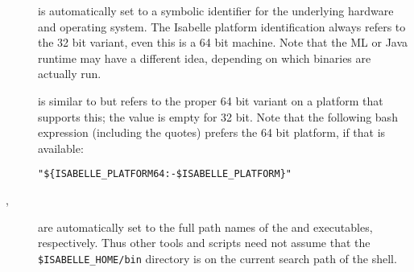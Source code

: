 \begin{isabellebody}
\begin{isamarkuptext}
\begin{description}
  \item[\hypertarget{setting.ISABELLE-PLATFORM}{\hyperlink{setting.ISABELLE-PLATFORM}{\mbox{}}}] is automatically
  set to a symbolic identifier for the underlying hardware and
  operating system.  The Isabelle platform identification always
  refers to the 32 bit variant, even this is a 64 bit machine.  Note
  that the ML or Java runtime may have a different idea, depending on
  which binaries are actually run.

  \item[\hypertarget{setting.ISABELLE-PLATFORM64}{\hyperlink{setting.ISABELLE-PLATFORM64}{\mbox{}}}] is similar to
  \hyperlink{setting.ISABELLE-PLATFORM}{\mbox{}} but refers to the proper 64 bit variant
  on a platform that supports this; the value is empty for 32 bit.
  Note that the following bash expression (including the quotes)
  prefers the 64 bit platform, if that is available:

  \verb|"${ISABELLE_PLATFORM64:-$ISABELLE_PLATFORM}"|

  \item[\hypertarget{setting.ISABELLE-PROCESS}{\hyperlink{setting.ISABELLE-PROCESS}{\mbox{}}}, \hyperlink{setting.ISABELLE-TOOL}{\mbox{}}] are automatically set to the full path
  names of the \hyperlink{executable.isabelle-process}{\mbox{}} and \hyperlink{executable.isabelle}{\mbox{}} executables, respectively.  Thus other tools and scripts
  need not assume that the \verb|$ISABELLE_HOME/bin| directory is
  on the current search path of the shell.
  

\end{description}
\end{isamarkuptext}
\end{isabellebody}
